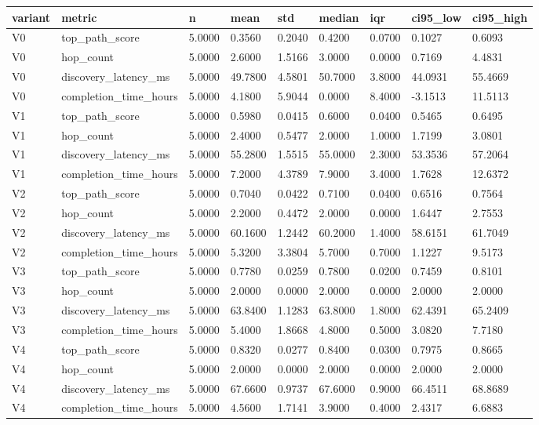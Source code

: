 \begin{tabular}{lllllllll}
\toprule
variant & metric & n & mean & std & median & iqr & ci95_low & ci95_high \\
\midrule
V0 & top_path_score & 5.0000 & 0.3560 & 0.2040 & 0.4200 & 0.0700 & 0.1027 & 0.6093 \\
V0 & hop_count & 5.0000 & 2.6000 & 1.5166 & 3.0000 & 0.0000 & 0.7169 & 4.4831 \\
V0 & discovery_latency_ms & 5.0000 & 49.7800 & 4.5801 & 50.7000 & 3.8000 & 44.0931 & 55.4669 \\
V0 & completion_time_hours & 5.0000 & 4.1800 & 5.9044 & 0.0000 & 8.4000 & -3.1513 & 11.5113 \\
V1 & top_path_score & 5.0000 & 0.5980 & 0.0415 & 0.6000 & 0.0400 & 0.5465 & 0.6495 \\
V1 & hop_count & 5.0000 & 2.4000 & 0.5477 & 2.0000 & 1.0000 & 1.7199 & 3.0801 \\
V1 & discovery_latency_ms & 5.0000 & 55.2800 & 1.5515 & 55.0000 & 2.3000 & 53.3536 & 57.2064 \\
V1 & completion_time_hours & 5.0000 & 7.2000 & 4.3789 & 7.9000 & 3.4000 & 1.7628 & 12.6372 \\
V2 & top_path_score & 5.0000 & 0.7040 & 0.0422 & 0.7100 & 0.0400 & 0.6516 & 0.7564 \\
V2 & hop_count & 5.0000 & 2.2000 & 0.4472 & 2.0000 & 0.0000 & 1.6447 & 2.7553 \\
V2 & discovery_latency_ms & 5.0000 & 60.1600 & 1.2442 & 60.2000 & 1.4000 & 58.6151 & 61.7049 \\
V2 & completion_time_hours & 5.0000 & 5.3200 & 3.3804 & 5.7000 & 0.7000 & 1.1227 & 9.5173 \\
V3 & top_path_score & 5.0000 & 0.7780 & 0.0259 & 0.7800 & 0.0200 & 0.7459 & 0.8101 \\
V3 & hop_count & 5.0000 & 2.0000 & 0.0000 & 2.0000 & 0.0000 & 2.0000 & 2.0000 \\
V3 & discovery_latency_ms & 5.0000 & 63.8400 & 1.1283 & 63.8000 & 1.8000 & 62.4391 & 65.2409 \\
V3 & completion_time_hours & 5.0000 & 5.4000 & 1.8668 & 4.8000 & 0.5000 & 3.0820 & 7.7180 \\
V4 & top_path_score & 5.0000 & 0.8320 & 0.0277 & 0.8400 & 0.0300 & 0.7975 & 0.8665 \\
V4 & hop_count & 5.0000 & 2.0000 & 0.0000 & 2.0000 & 0.0000 & 2.0000 & 2.0000 \\
V4 & discovery_latency_ms & 5.0000 & 67.6600 & 0.9737 & 67.6000 & 0.9000 & 66.4511 & 68.8689 \\
V4 & completion_time_hours & 5.0000 & 4.5600 & 1.7141 & 3.9000 & 0.4000 & 2.4317 & 6.6883 \\
\bottomrule
\end{tabular}
